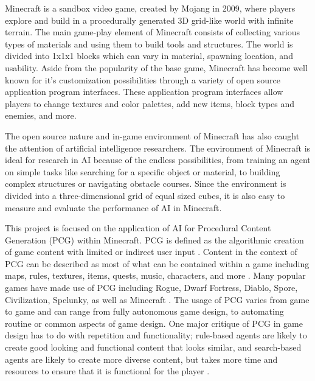\documentclass[11pt, oneside]{article}
\begin{document}
\begin{normalsize}

	Minecraft is a sandbox video game, created by Mojang in 2009, where players explore and build in a procedurally generated 3D grid-like world with infinite terrain. The main game-play element of Minecraft consists of collecting various types of materials and using them to build tools and structures. The world is divided into 1x1x1 blocks which can vary in material, spawning location, and usability. Aside from the popularity of the base game, Minecraft has become well known for it's customization possibilities through a variety of open source application program interfaces. These application program interfaces allow players to change textures and color palettes, add new items, block types and enemies, and more. 

The open source nature and in-game environment of Minecraft has also caught the attention of artificial intelligence researchers. The environment of Minecraft is ideal for research in AI because of the endless possibilities, from training an agent on simple tasks like searching for a specific object or material, to building complex structures or navigating obstacle courses. Since the environment is divided into a three-dimensional grid of equal sized cubes, it is also easy to measure and evaluate the performance of AI in Minecraft.

This project is focused on the application of AI for Procedural Content Generation (PCG) within Minecraft. PCG is defined as the algorithmic creation of game content with limited or indirect user input \cite{shaker2016procedural}. Content in the context of PCG can be described as most of what can be contained within a game including maps, rules, textures, items, quests, music, characters, and more \cite{shaker2016procedural}. Many popular games have made use of PCG including Rogue, Dwarf Fortress, Diablo, Spore, Civilization, Spelunky, as well as Minecraft \cite{shaker2016procedural}. The usage of PCG varies from game to game and can range from fully autonomous game design, to  automating routine or common aspects of game design. One major critique of PCG in game design has to do with repetition and functionality; rule-based agents are likely to create good looking and functional content that looks similar, and search-based agents are likely to create more diverse content, but takes more time and resources to ensure that it is functional for the player \cite{green_organic_2019}.


\end{normalsize}
\end{document}
